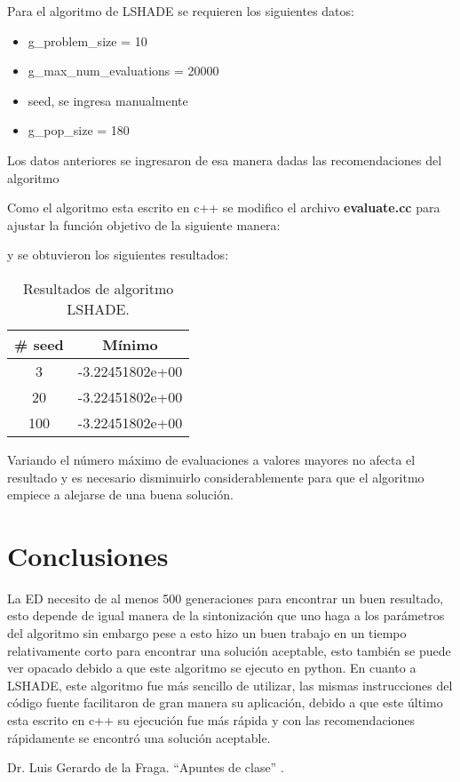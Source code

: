 \documentclass[conference]{IEEEtran}
\begin{document}
Para el algoritmo de LSHADE se requieren los siguientes datos:
\begin{itemize}
\item g\_{}problem\_{}size = 10
\item g\_{}max\_{}num\_{}evaluations = 20000
\item seed, se ingresa manualmente
\item g\_{}pop\_{}size = 180
\end{itemize}
Los datos anteriores se ingresaron de esa manera dadas las recomendaciones del algoritmo

Como el algoritmo esta escrito en c++ se modifico el archivo \textbf{evaluate.cc} para ajustar la función objetivo de la siguiente manera:



y se obtuvieron los siguientes resultados:

\begin{table}[!hbp]   
	\caption{Resultados de algoritmo LSHADE.}                                                                                                                
		\centering                                       
		\begin{tabular}{cc}
			\hline                                             
			\#{} seed & Mínimo \\                     
			\hline 
			3 & -3.22451802e+00\\       
			20 & -3.22451802e+00\\                                      
			100 & -3.22451802e+00\\  
			\hline                                             
		\end{tabular}
	\end{table}	
	
	Variando el número máximo de evaluaciones a valores mayores no afecta el resultado y es necesario disminuirlo considerablemente para que el algoritmo empiece a alejarse de una buena solución.

\section{Conclusiones}

La ED necesito de al menos 500 generaciones para encontrar un buen resultado, esto depende de igual manera de la sintonización que uno haga a los parámetros del algoritmo sin embargo pese a esto hizo un buen trabajo en un tiempo relativamente corto para encontrar una solución aceptable, esto también se puede ver opacado debido a que este algoritmo se ejecuto en python. En cuanto a LSHADE, este algoritmo fue más sencillo de utilizar, las mismas instrucciones del código fuente facilitaron de gran manera su aplicación, debido a que este último esta escrito en c++ su ejecución fue más rápida y con las recomendaciones rápidamente se encontró una solución aceptable.

\begin{thebibliography}{00}
  Dr. Luis Gerardo de la Fraga. ``Apuntes de clase'' .
\end{thebibliography}
\end{document}
